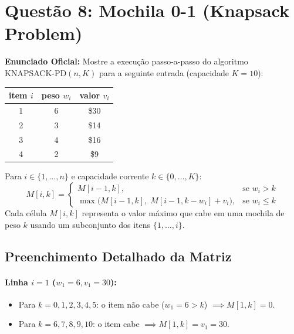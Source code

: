 \documentclass[11pt,a4paper]{article}
\begin{document}
\vspace{0.4cm}

\section*{Questão 8: Mochila 0-1 (Knapsack Problem)}

\textbf{Enunciado Oficial:} Mostre a execução passo-a-passo do algoritmo \textsc{KNAPSACK-PD}$(n, K)$ para a seguinte entrada (capacidade $K = 10$):
\begin{center}
\begin{tabular}{c|cc}
\toprule
\textbf{item} $i$ & \textbf{peso} $w_i$ & \textbf{valor} $v_i$ \\
\midrule
1 & 6 & \$30 \\
2 & 3 & \$14 \\
3 & 4 & \$16 \\
4 & 2 & \$9 \\
\bottomrule
\end{tabular}
\end{center}

\begin{teoria}
Para $i \in \{1, \dots, n\}$ e capacidade corrente $k \in \{0, \dots, K\}$:
\[
M[i, k] = 
\begin{cases}
M[i-1, k], & \text{se } w_i > k \\
\max\Big( M[i-1, k], \; M[i-1, k - w_i] + v_i \Big), & \text{se } w_i \le k
\end{cases}
\]
Cada célula $M[i, k]$ representa o valor máximo que cabe em uma mochila de peso $k$ usando um subconjunto dos itens $\{1, \dots, i\}$.
\end{teoria}

\subsection*{Preenchimento Detalhado da Matriz}

\paragraph{Linha $i = 1$ ($w_1 = 6, v_1 = 30$):}
\begin{itemize}
    \item Para $k = 0, 1, 2, 3, 4, 5$: o item não cabe ($w_1 = 6 > k$) $\implies M[1, k] = 0$.
    \item Para $k = 6, 7, 8, 9, 10$: o item cabe $\implies M[1, k] = v_1 = 30$.
\end{itemize}
\end{document}
